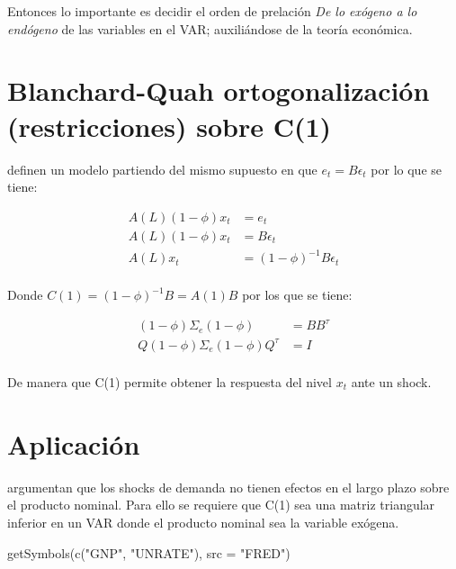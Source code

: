 \documentclass[
]{book}
\newenvironment{Shaded}{\begin{snugshade}}{\end{snugshade}}
\newcommand{\AttributeTok}[1]{\textcolor[rgb]{0.77,0.63,0.00}{#1}}
\newcommand{\FunctionTok}[1]{\textcolor[rgb]{0.00,0.00,0.00}{#1}}
\newcommand{\NormalTok}[1]{#1}
\newcommand{\StringTok}[1]{\textcolor[rgb]{0.31,0.60,0.02}{#1}}
\begin{document}
Entonces lo importante es decidir el orden de prelación \emph{De lo exógeno a lo endógeno} de las variables en el VAR; auxiliándose de la teoría económica.

\hypertarget{blanchard-quah-ortogonalizaciuxf3n-restricciones-sobre-c1}{%
\section{Blanchard-Quah ortogonalización (restricciones) sobre C(1)}\label{blanchard-quah-ortogonalizaciuxf3n-restricciones-sobre-c1}}

\citet{BLANCHARD88} definen un modelo partiendo del mismo supuesto en que \(e_{t}=B\epsilon_{t}\) por lo que se tiene:

\begin{align}
A(L)(1-\phi)x_{t}&=e_{t}\\
A(L)(1-\phi)x_{t}&=B\epsilon_{t}\\
A(L)x_{t}&=(1-\phi)^{-1}B\epsilon_{t}\\
\end{align}

Donde \(C(1)=(1-\phi)^{-1}B=A(1)B\) por los que se tiene:

\begin{align}
(1-\phi)\Sigma_{e}(1-\phi)&=BB^{\tau}\\
Q(1-\phi)\Sigma_e(1-\phi)Q^{\tau}&=I\\
\end{align}

De manera que C(1) permite obtener la respuesta del nivel \(x_{t}\) ante un shock.

\hypertarget{aplicaciuxf3n-blanchard88}{%
\section{\texorpdfstring{Aplicación \citet{BLANCHARD88}}{Aplicación @BLANCHARD88}}\label{aplicaciuxf3n-blanchard88}}

\citet{BLANCHARD88} argumentan que los shocks de demanda no tienen efectos en el largo plazo sobre el producto nominal. Para ello se requiere que C(1) sea una matriz triangular inferior en un VAR donde el producto nominal sea la variable exógena.

\begin{Shaded}
\begin{Highlighting}[]
\FunctionTok{getSymbols}\NormalTok{(}\FunctionTok{c}\NormalTok{(}\StringTok{"GNP"}\NormalTok{, }\StringTok{"UNRATE"}\NormalTok{),}
           \AttributeTok{src =} \StringTok{"FRED"}\NormalTok{)}
\end{Highlighting}
\end{Shaded}
\end{document}
